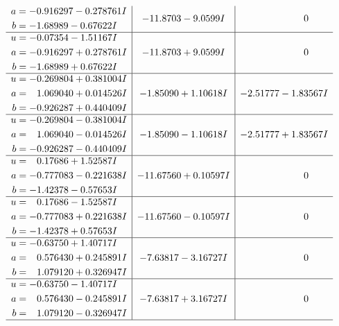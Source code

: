 \documentclass[1p]{elsarticle_modified}
\theoremstyle{definition}
\begin{document}
$$\begin{array}{c|c|c}
\begin{aligned}
a &= -0.916297 - 0.278761 I \\
b &= -1.68989 - 0.67622 I\end{aligned}
 & -11.8703 - 9.0599 I & \phantom{-0.000000 } 0 \\ \hline\begin{aligned}
u &= -0.07354 - 1.51167 I \\
a &= -0.916297 + 0.278761 I \\
b &= -1.68989 + 0.67622 I\end{aligned}
 & -11.8703 + 9.0599 I & \phantom{-0.000000 } 0 \\ \hline\begin{aligned}
u &= -0.269804 + 0.381004 I \\
a &= \phantom{-}1.069040 + 0.014526 I \\
b &= -0.926287 + 0.440409 I\end{aligned}
 & -1.85090 + 1.10618 I & -2.51777 - 1.83567 I \\ \hline\begin{aligned}
u &= -0.269804 - 0.381004 I \\
a &= \phantom{-}1.069040 - 0.014526 I \\
b &= -0.926287 - 0.440409 I\end{aligned}
 & -1.85090 - 1.10618 I & -2.51777 + 1.83567 I \\ \hline\begin{aligned}
u &= \phantom{-}0.17686 + 1.52587 I \\
a &= -0.777083 - 0.221638 I \\
b &= -1.42378 - 0.57653 I\end{aligned}
 & -11.67560 + 0.10597 I & \phantom{-0.000000 } 0 \\ \hline\begin{aligned}
u &= \phantom{-}0.17686 - 1.52587 I \\
a &= -0.777083 + 0.221638 I \\
b &= -1.42378 + 0.57653 I\end{aligned}
 & -11.67560 - 0.10597 I & \phantom{-0.000000 } 0 \\ \hline\begin{aligned}
u &= -0.63750 + 1.40717 I \\
a &= \phantom{-}0.576430 + 0.245891 I \\
b &= \phantom{-}1.079120 + 0.326947 I\end{aligned}
 & -7.63817 - 3.16727 I & \phantom{-0.000000 } 0 \\ \hline\begin{aligned}
u &= -0.63750 - 1.40717 I \\
a &= \phantom{-}0.576430 - 0.245891 I \\
b &= \phantom{-}1.079120 - 0.326947 I\end{aligned}
 & -7.63817 + 3.16727 I & \phantom{-0.000000 } 0\\
 \hline 
 \end{array}$$\newpage\newpage\renewcommand{\arraystretch}{1}
\end{document}
